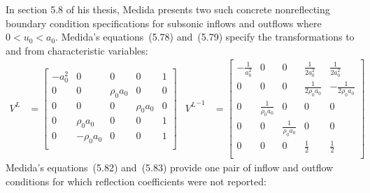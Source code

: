 \documentclass[letterpaper,11pt,nointlimits,reqno,draft]{amsart}
\begin{document}
In section 5.8 of his thesis, Medida presents two such concrete nonreflecting
boundary condition specifications for subsonic inflows and outflows where $0 <
u_0 < a_0$.  Medida's equations~(5.78) and~(5.79) specify the transformations
to and from characteristic variables:
\begin{align}
\label{eq:dimeulerapproxmedidaproj}
  V^L &= \begin{bmatrix}
    -a_0^2 & 0           & 0          & 0          & 1 \\
    0      & 0           & \rho_0 a_0 & 0          & 0 \\
    0      & 0           & 0          & \rho_0 a_0 & 0 \\
    0      & \rho_0 a_0  & 0          & 0          & 1 \\
    0      & -\rho_0 a_0 & 0          & 0          & 1 \\
  \end{bmatrix}
&
  {V^L}^{-1} &= \begin{bmatrix}
    -\frac{1}{a_0^2} & 0                    & 0                    & \frac{1}{2a_0^2}      & \frac{1}{2a_0^2}        \\
    0                & 0                    & 0                    & \frac{1}{2\rho_0 a_0} & - \frac{1}{2\rho_0 a_0} \\
    0                & \frac{1}{\rho_0 a_0} & 0                    & 0                     & 0                       \\
    0                & 0                    & \frac{1}{\rho_0 a_0} & 0                     & 0                       \\
    0                & 0                    & 0                    & \frac{1}{2}           & \frac{1}{2}             \\
  \end{bmatrix}
\end{align}
Medida's equations~(5.82) and~(5.83) provide one pair of inflow and outflow
conditions for which reflection coefficients were not reported:
\end{document}
